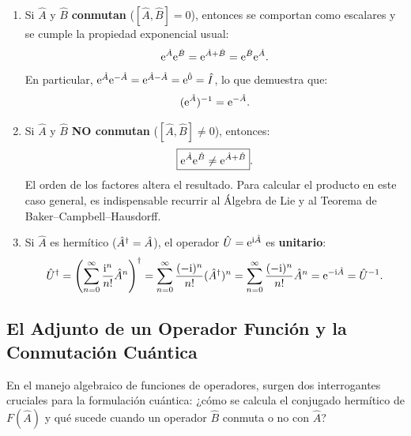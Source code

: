 \begin{alertabox}
    \begin{enumerate}
        \item Si $\hat{A}$ y $\hat{B}$ \textbf{conmutan} ($[\hat{A}, \hat{B}] = 0$), entonces se comportan como escalares y se cumple la propiedad exponencial usual:
        \begin{equation}
            \mathrm{e}^{\hat{A}}\mathrm{e}^{\hat{B}} = \mathrm{e}^{\hat{A}+\hat{B}} = \mathrm{e}^{\hat{B}}\mathrm{e}^{\hat{A}}.
        \end{equation}
        En particular, $\mathrm{e}^{\hat{A}}\mathrm{e}^{-\hat{A}} = \mathrm{e}^{\hat{A}-\hat{A}} = \mathrm{e}^{\hat{0}} = \hat{I}$, lo que demuestra que:
        \begin{equation}
            (\mathrm{e}^{\hat{A}})^{-1} = \mathrm{e}^{-\hat{A}}.
        \end{equation}
        \item Si $\hat{A}$ y $\hat{B}$ \textbf{NO conmutan} ($[\hat{A}, \hat{B}] \neq 0$), entonces:
        \begin{equation}
            \boxed{\mathrm{e}^{\hat{A}}\mathrm{e}^{\hat{B}} \neq \mathrm{e}^{\hat{A}+\hat{B}}}.
        \end{equation}
        El orden de los factores altera el resultado. Para calcular el producto en este caso general, es indispensable recurrir al Álgebra de Lie y al Teorema de Baker--Campbell--Hausdorff.
        \item Si $\hat{A}$ es hermítico ($\hat{A}^\dagger = \hat{A}$), el operador $\hat{U} = \mathrm{e}^{\mathrm{i}\hat{A}}$ es \textbf{unitario}:
        \begin{equation}
            \hat{U}^\dagger = \left(\sum_{n=0}^\infty \frac{\mathrm{i}^n}{n!}\hat{A}^n\right)^\dagger = \sum_{n=0}^\infty \frac{(-\mathrm{i})^n}{n!}(\hat{A}^\dagger)^n = \sum_{n=0}^\infty \frac{(-\mathrm{i})^n}{n!}\hat{A}^n = \mathrm{e}^{-\mathrm{i}\hat{A}} = \hat{U}^{-1}.
        \end{equation}
    \end{enumerate}
\end{alertabox}

\subsection{El Adjunto de un Operador Función y la Conmutación Cuántica}
\label{subsec:adjunto_operador_funcion}

En el manejo algebraico de funciones de operadores, surgen dos interrogantes cruciales para la formulación cuántica: ¿cómo se calcula el conjugado hermítico de $F(\hat{A})$ y qué sucede cuando un operador $\hat{B}$ conmuta o no con $\hat{A}$?

